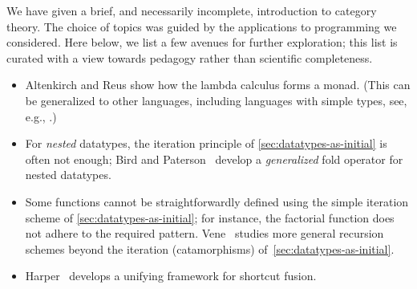\documentclass[a4paper,11pt, oneside,titlepage=false]{scrbook}
\theoremstyle{plain}
\theoremstyle{definition}
\begin{document}
We have given a brief, and necessarily incomplete, introduction to category theory.
The choice of topics was guided by the applications to programming we considered.
 Here below, we list a few avenues for further exploration; this list is curated with a view towards pedagogy rather than scientific completeness.
\begin{itemize}
\item Altenkirch and Reus show how the lambda calculus forms a monad.
  (This can be generalized to other languages, including languages with simple types, see, e.g., \cite{DBLP:journals/jfrea/AhrensZ11}.)
\item For \emph{nested} datatypes, the iteration principle of \cref{sec:datatypes-as-initial} is often not enough; Bird and Paterson~\cite{DBLP:journals/fac/BirdP99} develop a \emph{generalized} fold operator for nested datatypes.
\item Some functions cannot be straightforwardly defined using the simple iteration scheme of \cref{sec:datatypes-as-initial}; for instance, the factorial function does not adhere to the required pattern.
  Vene~\cite{vene_phd} studies more general recursion schemes beyond the iteration (catamorphisms) of~\cref{sec:datatypes-as-initial}.
\item Harper~\cite{DBLP:phd/ethos/Harper13} develops a unifying framework for shortcut fusion.

\end{itemize}


\appendix









\printbibliography
\end{document}
